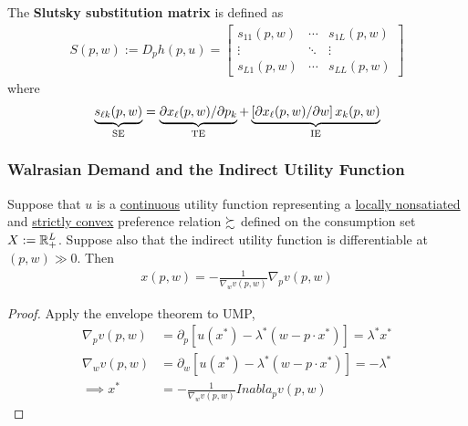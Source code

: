 \documentclass{report}
\begin{document}
 			\begin{definition}
 				The \textbf{Slutsky substitution matrix} is defined as
 				\begin{align}
 					S(p, w) := D_p h(p, u) = \left[ \begin{array}{ccc}{s_{11}(p, w)} & {\cdots} & {s_{1 L}(p, w)} \\ {\vdots} & {\ddots} & {\vdots} \\ {s_{L 1}(p, w)} & {\cdots} & {s_{L L}(p, w)}\end{array}\right]
 				\end{align}
 				where 
 				\begin{align}
 					\underbrace{s_{\ell k}(p, w)}_{\text{{SE}}}
 					=\underbrace{\partial x_{\ell}(p, w) / \partial p_{k}}_{\text{{TE}}}
 					+\underbrace{\left[\partial x_{\ell}(p, w) / \partial w\right] x_{k}(p, w)}_{\text{{IE}}}
 				\end{align}
 			\end{definition}
 			
 			\subsubsection{Walrasian Demand and the Indirect Utility Function}
 			
 			\begin{proposition}
 				Suppose that $u$ is a \ul{continuous} utility function representing a \ul{locally nonsatiated} and \ul{strictly convex} preference relation $\succsim$ defined on the consumption set $X := \mathbb{R}^L_+$. Suppose also that the indirect utility function is differentiable at $(p, w) \gg 0$. Then
 				\begin{align}
 					x(p, w)=-\frac{1}{\nabla_{w} v(p, w)} \nabla_{p} v(p, w)
 				\end{align}
 			\end{proposition}
 			
 			\begin{proof}
 				Apply the envelope theorem to UMP, 
 				\begin{align}
 					\nabla_p v(p, w) &= \partial_p [u(x^*) - \lambda^*(w - p \cdot x^*)] = \lambda^*x^* \\
 					\nabla_w v(p, w) &= \partial_w [u(x^*) - \lambda^*(w - p \cdot x^*)] = -\lambda^* \\
 					\implies x^* &= - \frac{1}{\nabla_w v(p, w)} Inabla_p v(p, w) 
 				\end{align}
 			\end{proof}
 			
\end{document}
